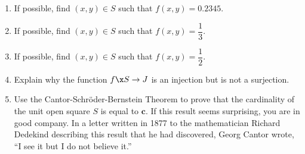 \begin{enumerate}
\begin{enumerate}
\item If possible, find $(x, y) \in S$ such that $f ( x, y ) = 0.2345$.

\item If possible, find $(x, y) \in S$ such that $f ( x, y ) = \dfrac{1}{3}$.

\item If possible, find $(x, y) \in S$ such that $f ( x, y ) = \dfrac{1}{2}$.

\item Explain why the function $f\x S \to J$ is an injection but is not a surjection.

\item Use the Cantor-Schr\"{o}der-Bernstein Theorem to prove that the cardinality of the unit open square $S$ is equal to $\boldsymbol{c}$. If this result seems surprising, you are in good company.  In a letter written in 1877 to the mathematician Richard Dedekind describing this result that he had discovered, Georg Cantor wrote, ``I see it but I do not believe it.''
\end{enumerate}
 
\end{enumerate}


